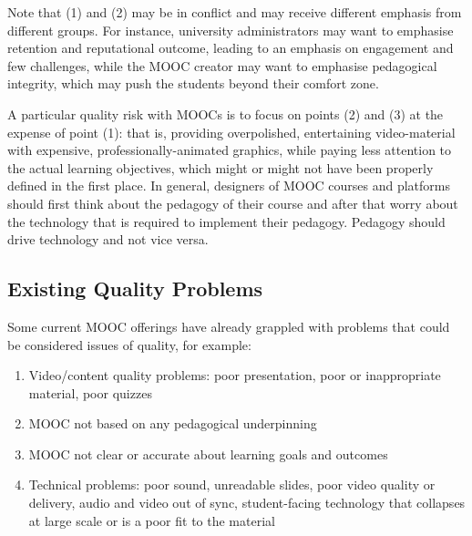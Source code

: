 Note that (1) and (2) may be in conflict and may receive different
emphasis from different groups. For instance, university administrators
may want to emphasise retention and reputational
outcome, leading to an emphasis on engagement and few challenges,
while the MOOC
creator may want to emphasise pedagogical integrity, which may push the
students beyond their comfort zone.

A particular quality risk with MOOCs is to focus on points (2) and (3)
at the expense of point (1): that is, providing overpolished,
entertaining video-material with expensive, professionally-animated
graphics, while paying less attention to
the actual learning objectives, which might or might not have 
been properly defined in the first place. In general, designers of MOOC
courses and platforms should first think about the pedagogy of their
course and after that worry about the technology that is required to
implement their pedagogy. Pedagogy should drive technology and not vice
versa.


\subsection{Existing Quality Problems}

Some current MOOC offerings have already grappled with problems that
could be considered issues of quality, for example:

\begin{enumerate}

\item Video/content quality problems: poor presentation, poor or inappropriate
material, poor quizzes

\item MOOC not based on any pedagogical
underpinning 

\item MOOC not clear or accurate about learning goals and
outcomes

\item Technical problems: poor sound, unreadable slides, poor
video quality or delivery, audio and video out of sync, student-facing
technology that collapses at large scale or is a poor fit to the material

\end{enumerate}

